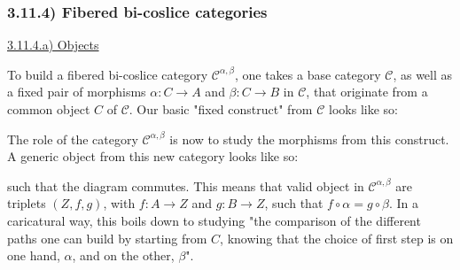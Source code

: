 \documentclass[12pt, letterpaper, twoside]{report}
\begin{document}
\subsubsection*{3.11.4) Fibered bi-coslice categories}

\vspace{5mm}
\underline{3.11.4.a) Objects}

To build a fibered bi-coslice category $\mathcal{C}^{\alpha, \beta}$, one takes a base category $\mathcal{C}$, as well as a fixed pair of morphisms $\alpha : C \to A$ and $\beta : C \to B$ in $\mathcal{C}$, that originate from a common object $C$ of $\mathcal{C}$. Our basic "fixed construct" from $\mathcal{C}$ looks like so: 


The role of the category $\mathcal{C}^{\alpha, \beta}$ is now to study the morphisms from this construct. A generic object from this new category looks like so:


such that the diagram commutes. This means that valid object in $\mathcal{C}^{\alpha, \beta}$ are triplets $(Z, f, g)$, with $f : A \to Z$ and $g : B \to Z$, such that $f \circ \alpha = g \circ \beta$. In a caricatural way, this boils down to studying "the comparison of the different paths one can build by starting from $C$, knowing that the choice of first step is on one hand, $\alpha$, and on the other, $\beta$".
\end{document}

